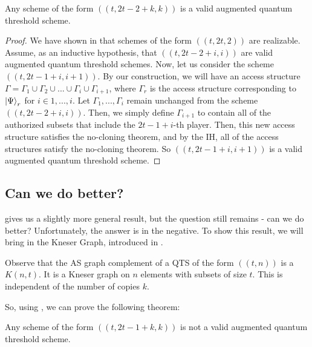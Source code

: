 \begin{theorem}
    \label{thm:build-scheme} 
    Any scheme of the form $((t,2t-2+k,k))$ is a valid augmented quantum threshold scheme.
\end{theorem}

\begin{proof}
    We have shown in  that schemes of the form $((t, 2t, 2))$ are realizable. Assume, as an inductive hypothesis, that $((t, 2t - 2 + i, i))$ are valid augmented quantum threshold schemes. Now, let us consider the scheme $((t, 2t-1+i, i+1))$. By our construction, we will have an access structure $\Gamma = \Gamma_1 \cup \Gamma_2 \cup ... \cup \Gamma_i \cup \Gamma_{i+1}$, where $\Gamma_r$ is the access structure corresponding to $\ket{\Psi}_r$ for $i \in {1,...,i}$. Let $\Gamma_1, ..., \Gamma_i$ remain unchanged from the scheme $((t, 2t - 2 + i, i))$. Then, we simply define $\Gamma_{i+1}$ to contain all of the authorized subsets that include the $2t-1+i$-th player. Then, this new access structure satisfies the no-cloning theorem, and by the IH, all of the access structures satisfy the no-cloning theorem. So $((t, 2t-1+i, i+1))$ is a valid augmented quantum threshold scheme.
\end{proof}

\subsection{Can we do better?}
\label{ssec:better}

 gives us a slightly more general result, but the question still remains - can we do better? Unfortunately, the answer is in the negative. To show this result, we will bring in the Kneser Graph, introduced in .

\begin{remark}
    Observe that the AS graph complement of a QTS of the form $((t,n))$ is a $K(n,t)$. It is a Kneser graph on $n$ elements with subsets of size $t$. This is independent of the number of copies $k$.
\end{remark}

So, using , we can prove the following theorem:

\begin{theorem}
    \label{thm:no-more} 
    Any scheme of the form $((t,2t-1+k,k))$ is not a valid augmented quantum threshold scheme.
\end{theorem}

